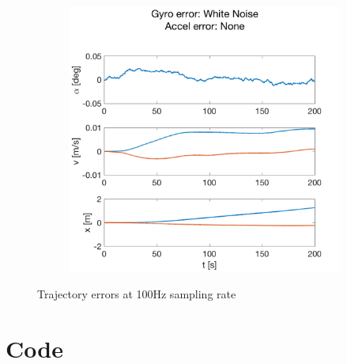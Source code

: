 \documentclass{article}
\begin{document}
\begin{figure}[H]
    \centering
    \begin{subfigure}[t]{0.49\textwidth}
        \centering
        \includegraphics[width=\textwidth]{fig/gyro_wn}
        \caption{}
    \end{subfigure}
    \caption{Trajectory errors at 100Hz sampling rate}
    \label{fig:error_gyro_2}
\end{figure}

\section*{Code}

\end{document}
